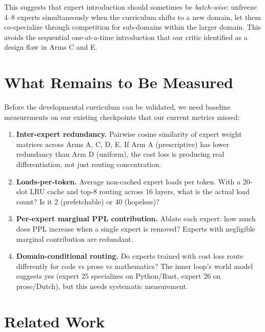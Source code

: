 \documentclass{article}
\begin{document}
This suggests that expert introduction should sometimes be \emph{batch-wise}: unfreeze 4--8 experts simultaneously when the curriculum shifts to a new domain, let them co-specialize through competition for sub-domains within the larger domain. This avoids the sequential one-at-a-time introduction that our critic identified as a design flaw in Arms C and E.

\section{What Remains to Be Measured}

Before the developmental curriculum can be validated, we need baseline measurements on our existing checkpoints that our current metrics missed:

\begin{enumerate}
    \item \textbf{Inter-expert redundancy.} Pairwise cosine similarity of expert weight matrices across Arms A, C, D, E. If Arm A (prescriptive) has lower redundancy than Arm D (uniform), the cost loss is producing real differentiation, not just routing concentration.
    \item \textbf{Loads-per-token.} Average non-cached expert loads per token. With a 20-slot LRU cache and top-8 routing across 16 layers, what is the actual load count? Is it 2 (prefetchable) or 40 (hopeless)?
    \item \textbf{Per-expert marginal PPL contribution.} Ablate each expert: how much does PPL increase when a single expert is removed? Experts with negligible marginal contribution are redundant.
    \item \textbf{Domain-conditional routing.} Do experts trained with cost loss route differently for code vs prose vs mathematics? The inner loop's world model suggests yes (expert 25 specializes on Python/Rust, expert 26 on prose/Dutch), but this needs systematic measurement.
\end{enumerate}

\section{Related Work}
\end{document}
